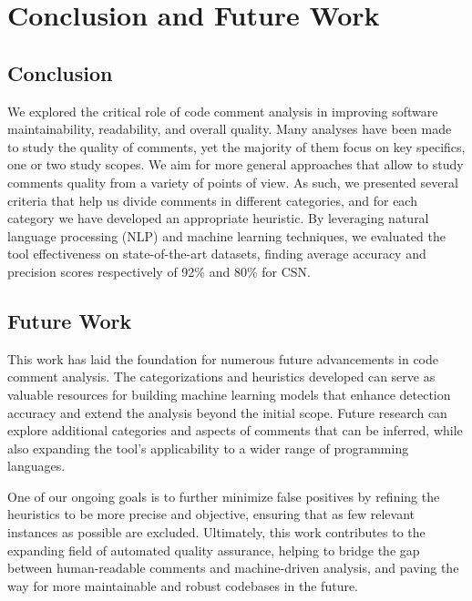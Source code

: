
\chapter{Conclusion and Future Work} %

\label{Chapter5}


\section{Conclusion}
We explored the critical role of code comment analysis in improving software maintainability, readability, and overall quality. Many analyses have been made to study the quality of comments, yet the majority of them focus on key specifics, one or two study scopes. We aim for more general approaches that allow to study comments quality from a variety of points of view. As such, we presented several criteria that help us divide comments in different categories, and for each category we have developed an appropriate heuristic. By leveraging natural language processing (NLP) and machine learning techniques, we evaluated the tool effectiveness on state-of-the-art datasets, finding average accuracy and precision scores respectively of 92\% and 80\% for CSN.

\section{Future Work}
This work has laid the foundation for numerous future advancements in code comment analysis. The categorizations and heuristics developed can serve as valuable resources for building machine learning models that enhance detection accuracy and extend the analysis beyond the initial scope. Future research can explore additional categories and aspects of comments that can be inferred, while also expanding the tool's applicability to a wider range of programming languages.

\noindent One of our ongoing goals is to further minimize false positives by refining the heuristics to be more precise and objective, ensuring that as few relevant instances as possible are excluded. Ultimately, this work contributes to the expanding field of automated quality assurance, helping to bridge the gap between human-readable comments and machine-driven analysis, and paving the way for more maintainable and robust codebases in the future.